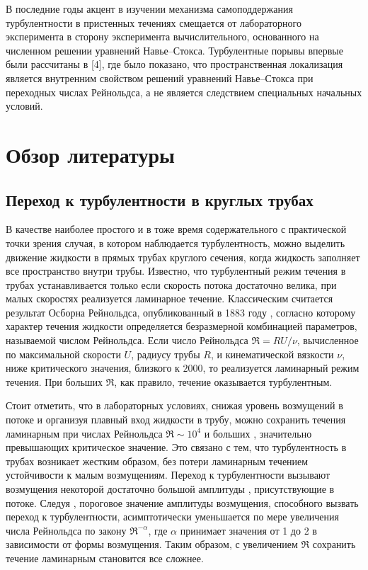В последние годы акцент в изучении механизма самоподдержания турбулентности в пристенных течениях смещается от лабораторного эксперимента в сторону эксперимента вычислительного, основанного на численном решении уравнений Навье--Стокса. Турбулентные порывы впервые были рассчитаны в [4], где было показано, что пространственная локализация является внутренним свойством решений уравнений Навье--Стокса при переходных числах Рейнольдса, а не является следствием специальных начальных условий. 

\section{Обзор литературы}

	\subsection{Переход к турбулентности в круглых трубах}

В качестве наиболее простого и в тоже время содержательного с практической точки зрения случая, в котором наблюдается турбулентность, можно выделить движение жидкости в прямых трубах круглого сечения, когда жидкость заполняет все пространство внутри трубы. Известно, что турбулентный режим течения в трубах устанавливается только если скорость потока достаточно велика, при малых скоростях реализуется ламинарное течение. Классическим считается результат Осборна Рейнольдса, опубликованный в 1883 году \cite{Reynolds1883}, согласно которому характер течения жидкости определяется безразмерной комбинацией параметров, называемой числом Рейнольдса. Если число Рейнольдса $\Re = RU/\nu$, вычисленное по максимальной скорости $U$, радиусу трубы $R$, и кинематической вязкости $\nu$, ниже критического значения, близкого к $2000$, то реализуется ламинарный режим течения. При больших $\Re$, как правило, течение оказывается турбулентным. 

Стоит отметить, что в лабораторных условиях, снижая уровень возмущений в потоке и организуя плавный вход жидкости в трубу, можно сохранить течения ламинарным при числах Рейнольдса $\Re \sim 10^4$ и больших \cite{Wygnanski1973, Darbyshire1995, vanDoorne2009}, значительно превышающих критическое значение. Это связано с тем, что турбулентность в трубах возникает жестким образом, без потери ламинарным течением устойчивости к малым возмущениям. Переход к турбулентности вызывают возмущения некоторой достаточно большой амплитуды \cite{Grossmann2000}, присутствующие в потоке. Следуя \cite{Darbyshire1995, Hof2003, Peixinho2007, Mellibovsky2009critical}, пороговое значение амплитуды возмущения, способного вызвать переход к турбулентности, асимптотически уменьшается по мере увеличения числа Рейнольдса по закону $\Re^{-\alpha}$, где $\alpha$ принимает значения от 1 до 2 в зависимости от формы возмущения. Таким образом, с увеличением $\Re$ сохранить течение ламинарным становится все сложнее. 

